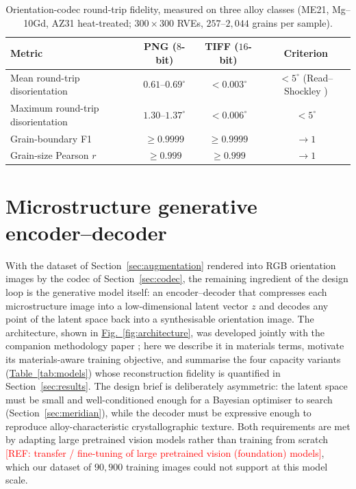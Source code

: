 \documentclass[preprint,12pt]{elsarticle}
\newcommand{\figref}[1]{\hyperref[#1]{Fig.~\ref*{#1}}}
\newcommand{\tabref}[1]{\hyperref[#1]{Table~\ref*{#1}}}
\newcommand{\refneeded}[1]{\textcolor{red}{[REF: #1]}} %
\begin{document}
\begin{table}[!t]
\centering
\caption{Orientation-codec round-trip fidelity, measured on three alloy classes (ME21, Mg--10Gd, AZ31 heat-treated; $300 \times 300$ RVEs, $257$--$2{,}044$ grains per sample).}
\label{tab:codec}
\renewcommand{\arraystretch}{1.15}
\begin{tabular}{l c c c}
\toprule
Metric & PNG ($8$-bit) & TIFF ($16$-bit) & Criterion \\
\midrule
Mean round-trip disorientation & $0.61$--$0.69^{\circ}$ & $<0.003^{\circ}$ & $<5^{\circ}$ (Read--Shockley \cite{readshockley1950}) \\
Maximum round-trip disorientation & $1.30$--$1.37^{\circ}$ & $<0.006^{\circ}$ & $<5^{\circ}$ \\
Grain-boundary F1 & $\geq 0.9999$ & $\geq 0.9999$ & $\rightarrow 1$ \\
Grain-size Pearson $r$ & $\geq 0.999$ & $\geq 0.999$ & $\rightarrow 1$ \\
\bottomrule
\end{tabular}
\end{table}


\section{Microstructure generative encoder--decoder}
\label{sec:generative}

With the dataset of Section~\ref{sec:augmentation} rendered into RGB orientation images by the codec of Section~\ref{sec:codec}, the remaining ingredient of the design loop is the generative model itself: an encoder--decoder that compresses each microstructure image into a low-dimensional latent vector $z$ and decodes any point of the latent space back into a synthesisable orientation image. The architecture, shown in \figref{fig:architecture}, was developed jointly with the companion methodology paper {\color{red}\cite{CoPiLOT2026}}; here we describe it in materials terms, motivate its materials-aware training objective, and summarise the four capacity variants (\tabref{tab:models}) whose reconstruction fidelity is quantified in Section~\ref{sec:results}. The design brief is deliberately asymmetric: the latent space must be small and well-conditioned enough for a Bayesian optimiser to search (Section~\ref{sec:meridian}), while the decoder must be expressive enough to reproduce alloy-characteristic crystallographic texture. Both requirements are met by adapting large pretrained vision models rather than training from scratch \refneeded{transfer / fine-tuning of large pretrained vision (foundation) models}, which our dataset of $90{,}900$ training images could not support at this model scale.
\end{document}
